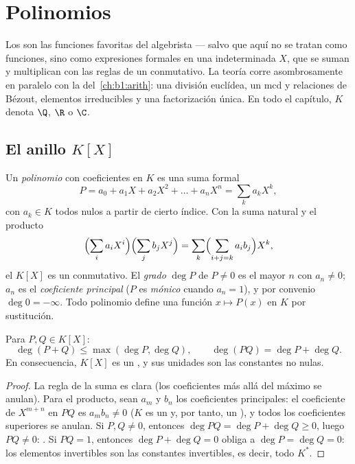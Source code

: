 \chapter{Polinomios}\label{ch:b1:poly}

Los  son las funciones favoritas del algebrista --- salvo
que aquí no se tratan como funciones, sino como expresiones formales en
una indeterminada $X$, que se suman y multiplican con las reglas de un
 conmutativo. La teoría corre asombrosamente en paralelo con la
del~\cref{ch:b1:arith}: una división euclídea, un mcd y relaciones de
Bézout, elementos irreducibles y una factorización única. En todo el
capítulo, $K$ denota $\Q$, $\R$ o $\C$.

\section{El anillo $K[X]$}

\begin{definition}\label{def:b1:poly:def}
Un \emph{polinomio} con coeficientes en $K$ es una
suma formal
\[
P = a_0 + a_1 X + a_2 X^2 + \dots + a_n X^n
= \sum_{k} a_k X^k,
\]
con $a_k \in K$ todos nulos a partir de cierto índice. Con la suma
natural y el producto
\[
\Bigl(\sum_i a_i X^i\Bigr)\Bigl(\sum_j b_j X^j\Bigr)
= \sum_k \Bigl(\sum_{i+j=k} a_i b_j\Bigr) X^k,
\]
el  $K[X]$ es un  conmutativo. El \emph{grado} $\deg P$
de $P \neq 0$ es el mayor $n$ con $a_n \neq 0$; $a_n$ es el
\emph{coeficiente principal} ($P$ es \emph{mónico} cuando $a_n = 1$), y por convenio $\deg 0 = -\infty$. Todo
polinomio define una función $x \mapsto P(x)$ en $K$ por sustitución.
\end{definition}

\begin{proposition}\label{prop:b1:poly:degree}
Para $P, Q \in K[X]$:
\[
\deg(P + Q) \leq \max(\deg P, \deg Q),
\qquad
\deg(PQ) = \deg P + \deg Q .
\]
En consecuencia, $K[X]$ es un , y sus unidades son
las constantes no nulas.
\end{proposition}

\begin{proof}
La regla de la suma es clara (los coeficientes más allá del máximo se
anulan). Para el producto, sean $a_m$ y $b_n$ los coeficientes
principales: el coeficiente de $X^{m+n}$ en $PQ$ es $a_m b_n \neq 0$
($K$ es un  y, por tanto, un ), y todos los
coeficientes superiores se anulan. Si $P, Q \neq 0$, entonces
$\deg PQ = \deg P + \deg Q \geq 0$, luego $PQ \neq 0$: . Si $PQ = 1$, entonces $\deg P + \deg Q = 0$ obliga a
$\deg P = \deg Q = 0$: los elementos invertibles son las constantes
invertibles, es decir, todo $K^*$.
\end{proof}

